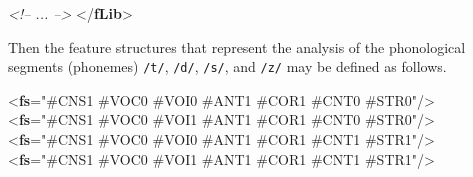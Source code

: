 \begin{shaded}
\hspace*{1em}\mbox{}\newline 
{}\mbox{}\newline 
\textit{<!-- ... -->}\mbox{}\newline 
{</\textbf{fLib}>}\end{shaded}\egroup\par \par
Then the feature structures that represent the analysis of the phonological segments (phonemes) \texttt{/t/}, \texttt{/d/}, \texttt{/s/}, and \texttt{/z/} may be defined as follows. \par\bgroup{}\exampleFont \begin{shaded}\noindent\mbox{}{<\textbf{fs}\hspace*{1em}{feats}="{\#CNS1 \#VOC0 \#VOI0 \#ANT1 \#COR1 \#CNT0 \#STR0}"/>}\mbox{}\newline 
{<\textbf{fs}\hspace*{1em}{feats}="{\#CNS1 \#VOC0 \#VOI1 \#ANT1 \#COR1 \#CNT0 \#STR0}"/>}\mbox{}\newline 
{<\textbf{fs}\hspace*{1em}{feats}="{\#CNS1 \#VOC0 \#VOI0 \#ANT1 \#COR1 \#CNT1 \#STR1}"/>}\mbox{}\newline 
{<\textbf{fs}\hspace*{1em}{feats}="{\#CNS1 \#VOC0 \#VOI1 \#ANT1 \#COR1 \#CNT1 \#STR1}"/>}\end{shaded}\egroup\par \par
